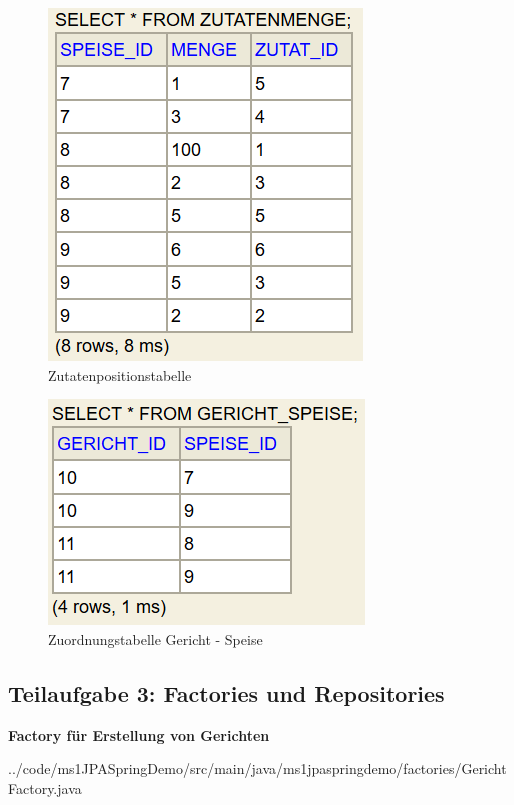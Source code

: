 \begin{figure}[H]
\centering
\includegraphics{ms1/screenshots/zutatenmenge_tbl.PNG}
\caption{Zutatenpositionstabelle}
\end{figure}

\begin{figure}[H]
\centering
\includegraphics{ms1/screenshots/gericht_speise_tbl.PNG}
\caption{Zuordnungstabelle Gericht - Speise}
\end{figure}

\subsection{Teilaufgabe 3: Factories und Repositories}

\begin{mdframed}[style=codebox]
\textbf{Factory für Erstellung von Gerichten}

{../code/ms1JPASpringDemo/src/main/java/ms1jpaspringdemo/factories/GerichtFactory.java}
\end{mdframed}

